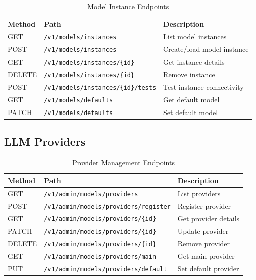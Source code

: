 \documentclass[a4paper,twoside]{sapthesis}
\begin{document}
\begin{table}[ht]
\centering
\caption{Model Instance Endpoints}
\label{tab:model-instance-endpoints}
\small
\begin{tabularx}{\textwidth}{llX}
    \hline
    \textbf{Method} & \textbf{Path} & \textbf{Description} \\
    \hline
    GET & \texttt{/v1/models/instances} & List model instances \\
    POST & \texttt{/v1/models/instances} & Create/load model instance \\
    GET & \texttt{/v1/models/instances/\{id\}} & Get instance details \\
    DELETE & \texttt{/v1/models/instances/\{id\}} & Remove instance \\
    POST & \texttt{/v1/models/instances/\{id\}/tests} & Test instance connectivity \\
    GET & \texttt{/v1/models/defaults} & Get default model \\
    PATCH & \texttt{/v1/models/defaults} & Set default model \\
    \hline
\end{tabularx}
\end{table}

\subsection{LLM Providers}

\begin{table}[ht]
\centering
\caption{Provider Management Endpoints}
\label{tab:provider-endpoints}
\small
\begin{tabularx}{\textwidth}{llX}
    \hline
    \textbf{Method} & \textbf{Path} & \textbf{Description} \\
    \hline
    GET & \texttt{/v1/admin/models/providers} & List providers \\
    POST & \texttt{/v1/admin/models/providers/register} & Register provider \\
    GET & \texttt{/v1/admin/models/providers/\{id\}} & Get provider details \\
    PATCH & \texttt{/v1/admin/models/providers/\{id\}} & Update provider \\
    DELETE & \texttt{/v1/admin/models/providers/\{id\}} & Remove provider \\
    GET & \texttt{/v1/admin/models/providers/main} & Get main provider \\
    PUT & \texttt{/v1/admin/models/providers/default} & Set default provider \\
    \hline
\end{tabularx}
\end{table}
\end{document}
